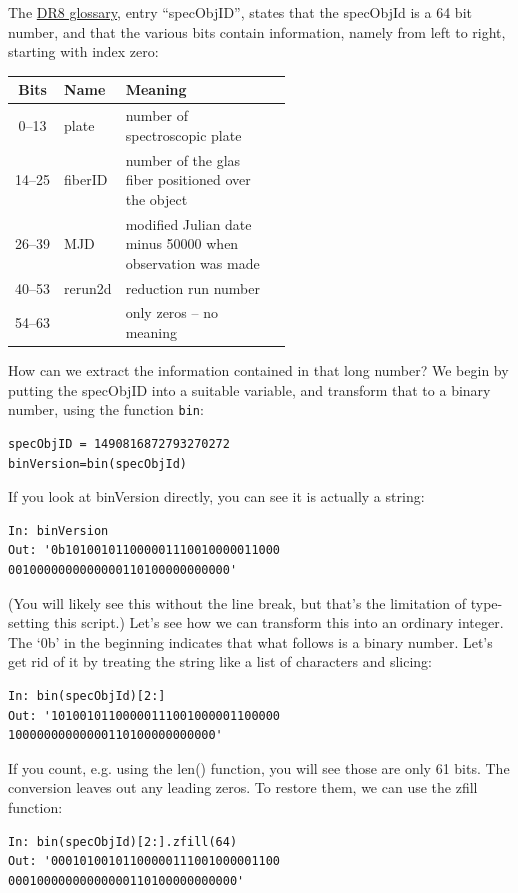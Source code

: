 \documentclass[twocolumn,apj]{openjournal}
\begin{document}
The \href{http://www.sdss3.org/dr8/glossary.php#S}{DR8 glossary}, entry ``specObjID'', states that the specObjId is a 64 bit number, and that the various bits contain information, namely from left to right, starting with index zero:
\begin{center}
\begin{tabular}{c|lp{0.55\linewidth}l}
Bits & Name & Meaning\\\hline\hline
0--13 & plate & number of spectroscopic plate\\\hline
14--25 & fiberID & number of the glas fiber positioned over the object\\\hline
26--39 & MJD & modified Julian date minus 50000 when observation was made\\\hline
40--53 & rerun2d & reduction run number\\\hline
54--63 &  & only zeros -- no meaning\\
\end{tabular}
\end{center}
How can we extract the information contained in that long number? We begin by putting the specObjID into a suitable variable, and transform that to a binary number, using the function \verb|bin|:
\begin{lstlisting}
specObjID = 1490816872793270272
binVersion=bin(specObjId)
\end{lstlisting}
If you look at binVersion directly, you can see it is actually a string:
\begin{lstlisting}
In: binVersion
Out: '0b101001011000001110010000011000
0010000000000000110100000000000'
\end{lstlisting}
(You will likely see this without the line break, but that's the limitation of type-setting this script.) Let's see how we can transform this into an ordinary integer.
The `0b' in the beginning indicates that what follows is a binary number. Let's get rid of it by treating the string like a list of characters and slicing:
\begin{lstlisting}
In: bin(specObjId)[2:]
Out: '10100101100000111001000001100000
10000000000000110100000000000'
\end{lstlisting}
If you count, e.g. using the len() function, you will see those are only 61 bits. The conversion leaves out any leading zeros. To restore them, we can use the zfill function:
\begin{lstlisting}
In: bin(specObjId)[2:].zfill(64)
Out: '00010100101100000111001000001100
00010000000000000110100000000000'
\end{lstlisting}
\end{document}
